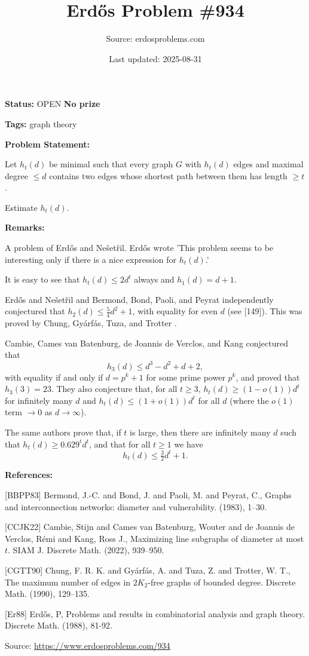 \documentclass{article}
\title{Erd\H{o}s Problem \#934}
\date{Last updated: 2025-08-31}
\author{Source: erdosproblems.com}
\begin{document}
\maketitle

\noindent\textbf{Status:} OPEN \quad \textbf{No prize}

\noindent\textbf{Tags:} graph theory

\medskip
\noindent\textbf{Problem Statement:}

Let $h_t(d)$ be minimal such that every graph $G$ with $h_t(d)$ edges and maximal degree $\leq d$ contains two edges whose shortest path between them has length $\geq t$.

Estimate $h_t(d)$.

\bigskip
\noindent\textbf{Remarks:}

A problem of Erd\H{o}s and Ne\v{s}et\v{r}il. Erd\H{o}s \cite{Er88} wrote 'This problem seems to be interesting only if there is a nice expression for $h_t(d)$.'

It is easy to see that $h_t(d)\leq 2d^t$ always and $h_1(d)=d+1$. 

Erd\H{o}s and Ne\v{s}et\v{r}il and Bermond, Bond, Paoli, and Peyrat \cite{BBPP83} independently conjectured that $h_2(d) \leq \tfrac{5}{4}d^2+1$, with equality for even $d$ (see [149]). This was proved by Chung, Gy\'{a}rf\'{a}s, Tuza, and Trotter \cite{CGTT90}.

Cambie, Cames van Batenburg, de Joannis de Verclos, and Kang \cite{CCJK22} conjectured that\[h_3(d) \leq d^3-d^2+d+2,\]with equality if and only if $d=p^k+1$ for some prime power $p^k$, and proved that $h_3(3)=23$. They also conjecture that, for all $t\geq 3$, $h_t(d)\geq (1-o(1))d^t$ for infinitely many $d$ and $h_t(d)\leq (1+o(1))d^t$ for all $d$ (where the $o(1)$ term $\to 0$ as $d\to \infty$).

The same authors prove that, if $t$ is large, then there are infinitely many $d$ such that $h_t(d) \geq 0.629^td^t$, and that for all $t\geq 1$ we have\[h_t(d) \leq \tfrac{3}{2}d^t+1.\]

\bigskip
\noindent\textbf{References:}

[BBPP83] Bermond, J.-C. and Bond, J. and Paoli, M. and Peyrat, C., Graphs and interconnection networks: diameter and
vulnerability. (1983), 1--30.
 
 [CCJK22] Cambie, Stijn and Cames van Batenburg, Wouter and de Joannis
de Verclos, R\'{e}mi and Kang, Ross J., Maximizing line subgraphs of diameter at most {$t$}. SIAM J. Discrete Math. (2022), 939--950.
 
 [CGTT90] Chung, F. R. K. and Gy\'{a}rf\'{a}s, A. and Tuza, Z. and Trotter,
W. T., The maximum number of edges in {$2K_2$}-free graphs of bounded
degree. Discrete Math. (1990), 129--135.
 
 [Er88] Erd\H{o}s, P, Problems and results in combinatorial analysis and graph theory. Discrete Math. (1988), 81-92.

\bigskip
\noindent\small{Source: \url{https://www.erdosproblems.com/934}}
\end{document}

